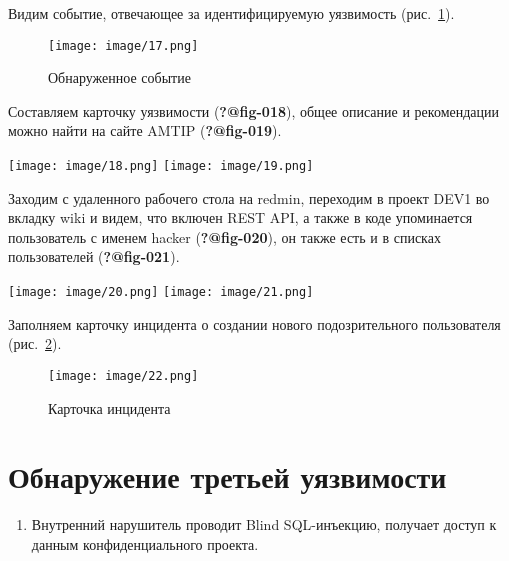 \documentclass[
  12pt,
  a4paper,
  DIV=11,
  numbers=noendperiod]{scrreprt}
\providecommand{\tightlist}{%
  \setlength{\itemsep}{0pt}\setlength{\parskip}{0pt}}\usepackage{longtable,booktabs,array}
\begin{document}
Видим событие, отвечающее за идентифицируемую уязвимость
(рис.~\ref{fig-017}).

\begin{figure}

{\centering \texttt{[image: image/17.png]}

}

\caption{\label{fig-017}Обнаруженное событие}

\end{figure}

Составляем карточку уязвимости (\textbf{?@fig-018}), общее описание и
рекомендации можно найти на сайте AMTIP (\textbf{?@fig-019}).

\texttt{[image: image/18.png]}
\texttt{[image: image/19.png]}

Заходим с удаленного рабочего стола на redmin, переходим в проект DEV1
во вкладку wiki и видем, что включен REST API, а также в коде
упоминается пользователь с именем hacker (\textbf{?@fig-020}), он также
есть и в списках пользователей (\textbf{?@fig-021}).

\texttt{[image: image/20.png]}
\texttt{[image: image/21.png]}

Заполняем карточку инцидента о создании нового подозрительного
пользователя (рис.~\ref{fig-022}).

\begin{figure}

{\centering \texttt{[image: image/22.png]}

}

\caption{\label{fig-022}Карточка инцидента}

\end{figure}

\hypertarget{ux43eux431ux43dux430ux440ux443ux436ux435ux43dux438ux435-ux442ux440ux435ux442ux44cux435ux439-ux443ux44fux437ux432ux438ux43cux43eux441ux442ux438}{%
\section{Обнаружение третьей
уязвимости}\label{ux43eux431ux43dux430ux440ux443ux436ux435ux43dux438ux435-ux442ux440ux435ux442ux44cux435ux439-ux443ux44fux437ux432ux438ux43cux43eux441ux442ux438}}

\begin{enumerate}
\def\labelenumi{\arabic{enumi}.}
\setcounter{enumi}{5}
\tightlist
\item
  Внутренний нарушитель проводит Blind SQL-инъекцию, получает доступ к
  данным конфиденциального проекта.
\end{enumerate}
\end{document}
